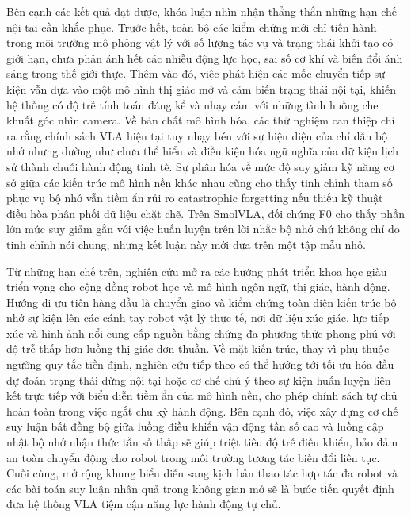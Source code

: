 Bên cạnh các kết quả đạt được, khóa luận nhìn nhận thẳng thắn những hạn chế nội tại cần khắc phục. Trước hết, toàn bộ các kiểm chứng mới chỉ tiến hành trong môi trường mô phỏng vật lý với số lượng tác vụ và trạng thái khởi tạo có giới hạn, chưa phản ánh hết các nhiễu động lực học, sai số cơ khí và biến đổi ánh sáng trong thế giới thực. Thêm vào đó, việc phát hiện các mốc chuyển tiếp sự kiện vẫn dựa vào một mô hình thị giác mở và cảm biến trạng thái nội tại, khiến hệ thống có độ trễ tính toán đáng kể và nhạy cảm với những tình huống che khuất góc nhìn camera. Về bản chất mô hình hóa, các thử nghiệm can thiệp chỉ ra rằng chính sách VLA hiện tại tuy nhạy bén với sự hiện diện của chỉ dẫn bộ nhớ nhưng dường như chưa thể hiểu và điều kiện hóa ngữ nghĩa của dữ kiện lịch sử thành chuỗi hành động tinh tế. Sự phân hóa về mức độ suy giảm kỹ năng cơ sở giữa các kiến trúc mô hình nền khác nhau cũng cho thấy tinh chỉnh tham số phục vụ bộ nhớ vẫn tiềm ẩn rủi ro catastrophic forgetting nếu thiếu kỹ thuật điều hòa phân phối dữ liệu chặt chẽ. Trên SmolVLA, đối chứng F0 cho thấy phần lớn mức suy giảm gắn với việc huấn luyện trên lời nhắc bộ nhớ chứ không chỉ do tinh chỉnh nói chung, nhưng kết luận này mới dựa trên một tập mẫu nhỏ.

Từ những hạn chế trên, nghiên cứu mở ra các hướng phát triển khoa học giàu triển vọng cho cộng đồng robot học và mô hình ngôn ngữ, thị giác, hành động. Hướng đi ưu tiên hàng đầu là chuyển giao và kiểm chứng toàn diện kiến trúc bộ nhớ sự kiện lên các cánh tay robot vật lý thực tế, nơi dữ liệu xúc giác, lực tiếp xúc và hình ảnh nổi cung cấp nguồn bằng chứng đa phương thức phong phú với độ trễ thấp hơn luồng thị giác đơn thuần. Về mặt kiến trúc, thay vì phụ thuộc ngưỡng quy tắc tiền định, nghiên cứu tiếp theo có thể hướng tới tối ưu hóa đầu dự đoán trạng thái dừng nội tại hoặc cơ chế chú ý theo sự kiện huấn luyện liên kết trực tiếp với biểu diễn tiềm ẩn của mô hình nền, cho phép chính sách tự chủ hoàn toàn trong việc ngắt chu kỳ hành động. Bên cạnh đó, việc xây dựng cơ chế suy luận bất đồng bộ giữa luồng điều khiển vận động tần số cao và luồng cập nhật bộ nhớ nhận thức tần số thấp sẽ giúp triệt tiêu độ trễ điều khiển, bảo đảm an toàn chuyển động cho robot trong môi trường tương tác biến đổi liên tục. Cuối cùng, mở rộng khung biểu diễn sang kịch bản thao tác hợp tác đa robot và các bài toán suy luận nhân quả trong không gian mở sẽ là bước tiến quyết định đưa hệ thống VLA tiệm cận năng lực hành động tự chủ.
